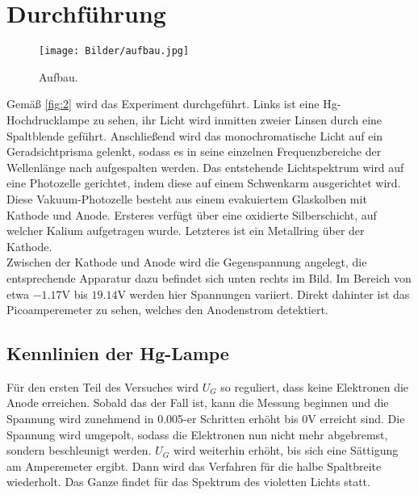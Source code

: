 \section{Durchführung}
\label{sec:Durchführung}

\begin{figure}[H]
    \centering
        \centering
        \texttt{[image: Bilder/aufbau.jpg]}
        \caption{Aufbau.}
    \hfill
    \label{fig:2}
\end{figure}
\noindent Gemäß \autoref{fig:2} wird das Experiment durchgeführt. Links ist
eine Hg-Hochdrucklampe zu sehen, ihr Licht wird inmitten zweier Linsen durch 
eine Spaltblende geführt. Anschließend wird das monochromatische Licht auf ein 
Geradsichtprisma gelenkt, sodass es in seine einzelnen Frequenzbereiche 
der Wellenlänge nach aufgespalten werden. Das entstehende Lichtspektrum 
wird auf eine Photozelle gerichtet, indem diese auf einem Schwenkarm 
ausgerichtet wird. Diese Vakuum-Photozelle besteht aus einem evakuiertem 
Glaskolben mit Kathode und Anode. Ersteres verfügt über eine oxidierte
Silberschicht, auf welcher Kalium aufgetragen wurde. Letzteres ist ein
Metallring über der Kathode.
\vspace{0.5em}
\\
\noindent Zwischen der Kathode und Anode wird die Gegenspannung angelegt, die 
entsprechende Apparatur dazu befindet sich unten rechts im Bild. Im Bereich 
von etwa $-1.17 \unit{\volt}$ bis $19.14 \unit{\volt}$ werden hier Spannungen 
variiert. Direkt dahinter ist das Picoamperemeter zu sehen, welches den 
Anodenstrom detektiert.

\subsection{Kennlinien der Hg-Lampe}
Für den ersten Teil des Versuches wird $U_G$ so reguliert, dass keine Elektronen 
die Anode erreichen. Sobald das der Fall ist, kann die Messung beginnen und 
die Spannung wird zunehmend in 0.005-er Schritten erhöht bis $0 \unit{\volt}$
erreicht sind. Die Spannung wird umgepolt, sodass die Elektronen nun nicht mehr 
abgebremst, sondern beschleunigt werden. $U_G$ wird weiterhin erhöht, bis sich
eine Sättigung am Amperemeter ergibt. Dann wird das Verfahren für die halbe 
Spaltbreite wiederholt. Das Ganze findet für das Spektrum des violetten Lichts 
statt.

